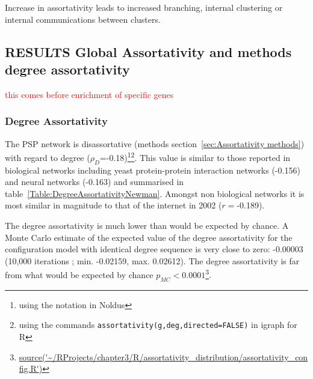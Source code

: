 Increase in assortativity leads to increased branching, internal clustering or internal communications between clusters\cite{estrada2011combinatorial}.
\subsection{RESULTS Global  Assortativity and methods degree assortativity}

\textcolor{red}{this comes before enrichment of specific genes}
\subsubsection{Degree Assortativity}


 The PSP network is disassortative (methods section~\ref{sec:Assortativity methods}) with regard to degree ($\rho_D$=-0.18)\footnote{using the notation in Noldus\cite{noldus2015assortativity}}\footnote{using the commands \texttt{assortativity(g,deg,directed=FALSE)} in igraph for R}. 
 This value   is similar to those reported in biological networks including yeast protein-protein interaction networks (-0.156) and neural networks (-0.163) \cite{newman2002assortative}  and summarised in table~\ref{Table:DegreeAssortativityNewman}. Amongst non biological networks it is most similar in magnitude to that of the internet in 2002\cite{newman2002assortative} ($r=$-0.189). 

The degree assortativity is much lower than would be expected by chance. A Monte Carlo estimate of the expected value of the degree assortativity for the configuration model with identical degree sequence is very close to zero: -0.00003 (10,000 iterations ; min. -0.02159, max.  0.02612). The degree assortativity is far from what would be expected by chance  $p_{MC}<0.0001$\footnote{\url{source('~/RProjects/chapter3/R/assortativity_distribution/assortativity_config.R')}}.

